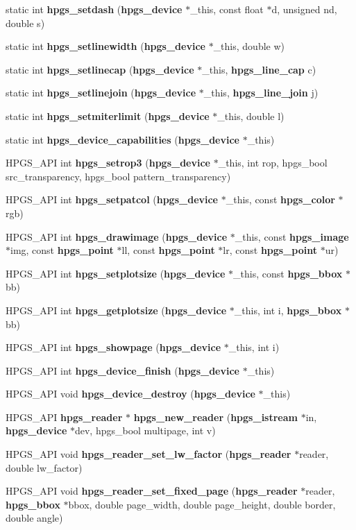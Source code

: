 \begin{CompactItemize}
static int {\bf hpgs\_\-setdash} ({\bf hpgs\_\-device} $\ast$\_\-this, const float $\ast$d, unsigned nd, double s)
\item 
static int {\bf hpgs\_\-setlinewidth} ({\bf hpgs\_\-device} $\ast$\_\-this, double w)
\item 
static int {\bf hpgs\_\-setlinecap} ({\bf hpgs\_\-device} $\ast$\_\-this, {\bf hpgs\_\-line\_\-cap} c)
\item 
static int {\bf hpgs\_\-setlinejoin} ({\bf hpgs\_\-device} $\ast$\_\-this, {\bf hpgs\_\-line\_\-join} j)
\item 
static int {\bf hpgs\_\-setmiterlimit} ({\bf hpgs\_\-device} $\ast$\_\-this, double l)
\item 
static int {\bf hpgs\_\-device\_\-capabilities} ({\bf hpgs\_\-device} $\ast$\_\-this)
\item 
HPGS\_\-API int {\bf hpgs\_\-setrop3} ({\bf hpgs\_\-device} $\ast$\_\-this, int rop, hpgs\_\-bool src\_\-transparency, hpgs\_\-bool pattern\_\-transparency)
\item 
HPGS\_\-API int {\bf hpgs\_\-setpatcol} ({\bf hpgs\_\-device} $\ast$\_\-this, const {\bf hpgs\_\-color} $\ast$rgb)
\item 
HPGS\_\-API int {\bf hpgs\_\-drawimage} ({\bf hpgs\_\-device} $\ast$\_\-this, const {\bf hpgs\_\-image} $\ast$img, const {\bf hpgs\_\-point} $\ast$ll, const {\bf hpgs\_\-point} $\ast$lr, const {\bf hpgs\_\-point} $\ast$ur)
\item 
HPGS\_\-API int {\bf hpgs\_\-setplotsize} ({\bf hpgs\_\-device} $\ast$\_\-this, const {\bf hpgs\_\-bbox} $\ast$bb)
\item 
HPGS\_\-API int {\bf hpgs\_\-getplotsize} ({\bf hpgs\_\-device} $\ast$\_\-this, int i, {\bf hpgs\_\-bbox} $\ast$bb)
\item 
HPGS\_\-API int {\bf hpgs\_\-showpage} ({\bf hpgs\_\-device} $\ast$\_\-this, int i)
\item 
HPGS\_\-API int {\bf hpgs\_\-device\_\-finish} ({\bf hpgs\_\-device} $\ast$\_\-this)
\item 
HPGS\_\-API void {\bf hpgs\_\-device\_\-destroy} ({\bf hpgs\_\-device} $\ast$\_\-this)
\item 
HPGS\_\-API {\bf hpgs\_\-reader} $\ast$ {\bf hpgs\_\-new\_\-reader} ({\bf hpgs\_\-istream} $\ast$in, {\bf hpgs\_\-device} $\ast$dev, hpgs\_\-bool multipage, int v)
\item 
HPGS\_\-API void {\bf hpgs\_\-reader\_\-set\_\-lw\_\-factor} ({\bf hpgs\_\-reader} $\ast$reader, double lw\_\-factor)
\item 
HPGS\_\-API void {\bf hpgs\_\-reader\_\-set\_\-fixed\_\-page} ({\bf hpgs\_\-reader} $\ast$reader, {\bf hpgs\_\-bbox} $\ast$bbox, double page\_\-width, double page\_\-height, double border, double angle)

\end{CompactItemize}
